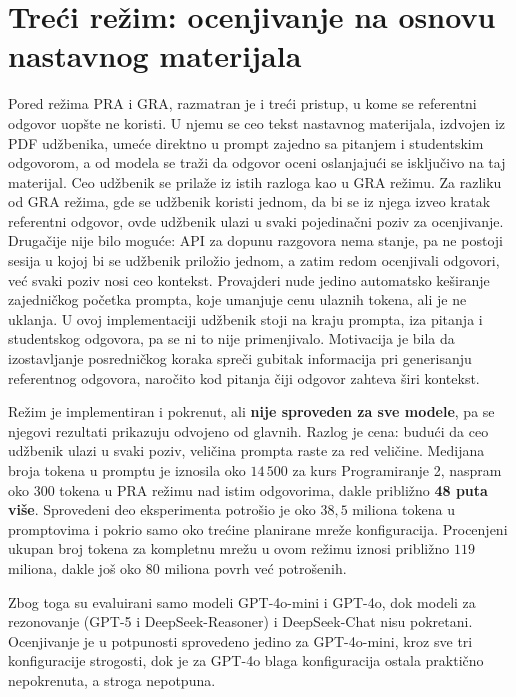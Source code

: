 \section{Treći režim: ocenjivanje na osnovu nastavnog materijala}
\label{sec:rezim-udzbenik}

Pored režima PRA i GRA, razmatran je i treći pristup, u kome se referentni odgovor uopšte ne koristi.
U njemu se ceo tekst nastavnog materijala, izdvojen iz PDF udžbenika, umeće direktno u prompt zajedno sa pitanjem i studentskim odgovorom,
a od modela se traži da odgovor oceni oslanjajući se isključivo na taj materijal.
Ceo udžbenik se prilaže iz istih razloga kao u GRA režimu.
Za razliku od GRA režima, gde se udžbenik koristi jednom, da bi se iz njega izveo kratak referentni odgovor,
ovde udžbenik ulazi u svaki pojedinačni poziv za ocenjivanje.
Drugačije nije bilo moguće: API za dopunu razgovora nema stanje,
pa ne postoji sesija u kojoj bi se udžbenik priložio jednom, a zatim redom ocenjivali odgovori, već svaki poziv nosi ceo kontekst.
Provajderi nude jedino automatsko keširanje zajedničkog početka prompta, koje umanjuje cenu ulaznih tokena, ali je ne uklanja.
U ovoj implementaciji udžbenik stoji na kraju prompta, iza pitanja i studentskog odgovora, pa se ni to nije primenjivalo.
Motivacija je bila da izostavljanje posredničkog koraka spreči gubitak informacija pri generisanju referentnog odgovora,
naročito kod pitanja čiji odgovor zahteva širi kontekst.

Režim je implementiran i pokrenut, ali \textbf{nije sproveden za sve modele},
pa se njegovi rezultati prikazuju odvojeno od glavnih.
Razlog je cena: budući da ceo udžbenik ulazi u svaki poziv, veličina prompta raste za red veličine.
Medijana broja tokena u promptu je iznosila oko $14\,500$ za kurs Programiranje 2,
naspram oko $300$ tokena u PRA režimu nad istim odgovorima, dakle približno \textbf{48 puta više}.
Sprovedeni deo eksperimenta potrošio je oko $38{,}5$ miliona tokena u promptovima i pokrio samo oko trećine planirane mreže konfiguracija.
Procenjeni ukupan broj tokena za kompletnu mrežu u ovom režimu iznosi približno $119$ miliona, dakle još oko $80$ miliona povrh već potrošenih.

Zbog toga su evaluirani samo modeli GPT-4o-mini i GPT-4o,
dok modeli za rezonovanje (GPT-5 i DeepSeek-Reasoner) i DeepSeek-Chat nisu pokretani.
Ocenjivanje je u potpunosti sprovedeno jedino za GPT-4o-mini, kroz sve tri konfiguracije strogosti,
dok je za GPT-4o blaga konfiguracija ostala praktično nepokrenuta, a stroga nepotpuna.

